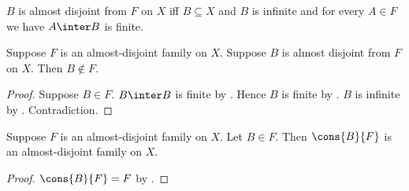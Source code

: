 \begin{definition}\label{almost_disjoint_from_family_on}
    $B$ is almost disjoint from $F$ on $X$ iff
        $B\subseteq X$ and $B$ is infinite and
        for every $A\in F$ we have $A\inter B$ is finite.
\end{definition}

\begin{proposition}\label{almost_disjoint_from_family_not_member}
    Suppose $F$ is an almost-disjoint family on $X$.
    Suppose $B$ is almost disjoint from $F$ on $X$.
    Then $B\notin F$.
\end{proposition}
\begin{proof}
    Suppose $B\in F$.
    $B\inter B$ is finite by .
    Hence $B$ is finite by .
    $B$ is infinite by .
    Contradiction.
\end{proof}

\begin{proposition}\label{almost_disjoint_cons_of_member}
    Suppose $F$ is an almost-disjoint family on $X$.
    Let $B\in F$.
    Then $\cons{B}{F}$ is an almost-disjoint family on $X$.
\end{proposition}
\begin{proof}
    $\cons{B}{F}=F$ by .
\end{proof}

